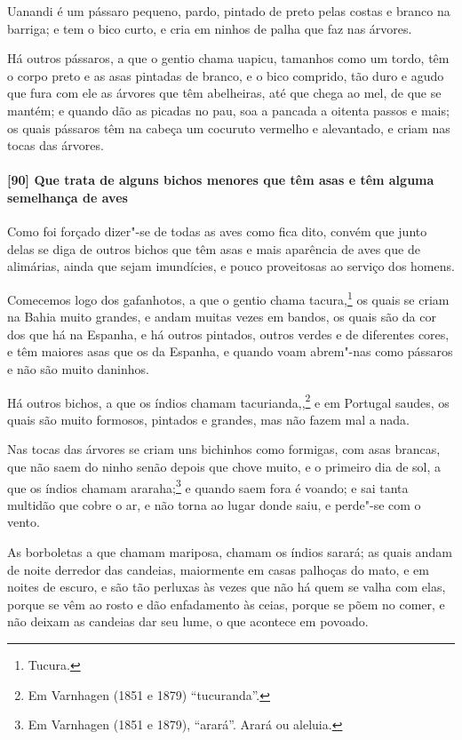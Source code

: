 \begin{linenumbers}
Uanandi é um pássaro pequeno, pardo, pintado de preto pelas costas e branco na barriga; e
tem o bico curto, e cria em ninhos de palha que faz nas árvores.

Há outros pássaros, a que o gentio chama uapicu, tamanhos como um tordo, têm o corpo preto
e as asas pintadas de branco, e o bico comprido, tão duro e agudo que fura com ele as
árvores que têm abelheiras, até que chega ao mel, de que se mantém; e quando dão as
picadas no pau, soa a pancada a oitenta passos e mais; os quais pássaros têm na cabeça um
cocuruto vermelho e alevantado, e criam nas tocas das árvores.

\paragraph{[90] Que trata de alguns bichos menores que têm asas e têm alguma semelhança de
aves}\quad
Como foi forçado dizer"-se de todas as aves como fica dito, convém que junto delas se diga
de outros bichos que têm asas e mais aparência de aves que de alimárias, ainda que sejam
imundícies, e pouco proveitosas ao serviço dos homens.

Comecemos logo dos gafanhotos, a que o gentio chama tacura,\footnote{ Tucura.} os quais se
criam na Bahia muito grandes, e andam muitas vezes em bandos, os quais são da cor dos que
há na Espanha, e há outros pintados, outros verdes e de diferentes cores, e têm maiores
asas que os da Espanha, e quando voam abrem"-nas como pássaros e não são muito daninhos.

Há outros bichos, a que os índios chamam tacurianda,,\footnote{ Em Varnhagen (1851 e 1879)
``tucuranda''.} e em Portugal saudes, os quais são muito formosos, pintados e grandes,
mas não fazem mal a nada.

Nas tocas das árvores se criam uns bichinhos como formigas, com asas brancas, que não saem
do ninho senão depois que chove muito, e o primeiro dia de sol, a que os índios chamam
araraha;\footnote{ Em Varnhagen (1851 e 1879), ``arará''. Arará ou aleluia.} e quando saem
fora é voando; e sai tanta multidão que cobre o ar, e não torna ao lugar donde saiu, e
perde"-se com o vento.

As borboletas a que chamam mariposa, chamam os índios sarará; as quais andam de noite
derredor das candeias, maiormente em casas palhoças do mato, e em noites de escuro, e são
tão perluxas às vezes que não há quem se valha com elas, porque se vêm ao rosto e dão
enfadamento às ceias, porque se põem no comer, e não deixam as candeias dar seu lume, o
que acontece em povoado.


\end{linenumbers}
